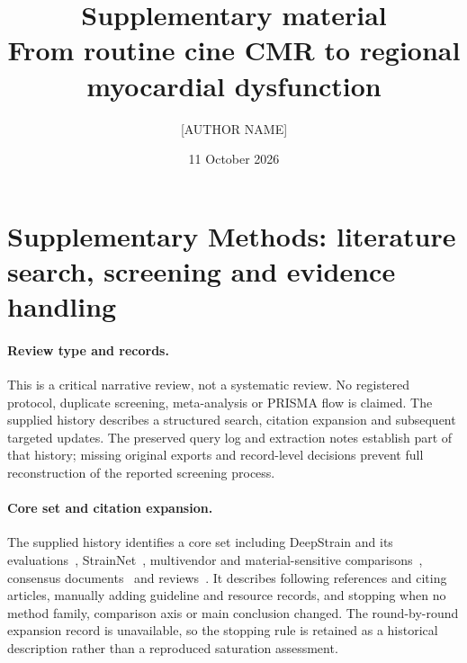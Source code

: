 \documentclass[11pt,a4paper]{article}
\title{\textbf{Supplementary material}\\[0.3em]
\large From routine cine CMR to regional myocardial dysfunction}
\author{[AUTHOR NAME]}
\date{11 October 2026}
\begin{document}
\maketitle
\vspace{1.2em}

\section*{Supplementary Methods: literature search, screening and evidence handling}

\paragraph{Review type and records.} This is a critical narrative review, not a systematic review. No registered protocol, duplicate screening, meta-analysis or PRISMA flow is claimed. The supplied history describes a structured search, citation expansion and subsequent targeted updates. The preserved query log and extraction notes establish part of that history; missing original exports and record-level decisions prevent full reconstruction of the reported screening process.

\paragraph{Core set and citation expansion.} The supplied history identifies a core set including DeepStrain and its evaluations~\cite{morales2021,morales2022comparison,mrxcat2023}, StrainNet~\cite{wang2023strainnet}, multivendor and material-sensitive comparisons~\cite{militaru2021,cao2018,wehner2018,kihlberg2020clinical}, consensus documents~\cite{voigt2015,puntmann2018,schulzmenger2020,hundley2022} and reviews~\cite{amzulescu2019,duchateau2020,smiseth2025,monfared2026review,hussein2026review}. It describes following references and citing articles, manually adding guideline and resource records, and stopping when no method family, comparison axis or main conclusion changed. The round-by-round expansion record is unavailable, so the stopping rule is retained as a historical description rather than a reproduced saturation assessment.
\end{document}
